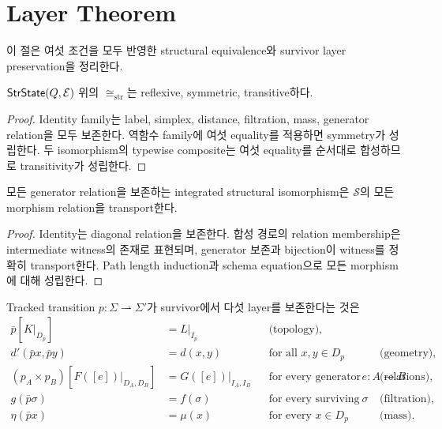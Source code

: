 \section{Layer Theorem}
이 절은 여섯 조건을 모두 반영한 structural equivalence와 survivor layer preservation을 정리한다.

\begin{proposition}
$\mathsf{StrState}(Q,\mathcal E)$ 위의 $\cong_{\mathrm{str}}$는 reflexive, symmetric, transitive하다.
\end{proposition}

\begin{proof}
Identity family는 label, simplex, distance, filtration, mass, generator relation을 모두 보존한다. 역함수 family에 여섯 equality를 적용하면 symmetry가 성립한다. 두 isomorphism의 typewise composite는 여섯 equality를 순서대로 합성하므로 transitivity가 성립한다.
\end{proof}

\begin{proposition}
모든 generator relation을 보존하는 integrated structural isomorphism은 $\mathcal S$의 모든 morphism relation을 transport한다.
\end{proposition}

\begin{proof}
Identity는 diagonal relation을 보존한다. 합성 경로의 relation membership은 intermediate witness의 존재로 표현되며, generator 보존과 bijection이 witness를 정확히 transport한다. Path length induction과 schema equation으로 모든 morphism에 대해 성립한다.
\end{proof}

\begin{definition}
Tracked transition $p:\Sigma\rightharpoonup\Sigma'$가 survivor에서 다섯 layer를 보존한다는 것은
\begin{align*}
\bar p[K|_{D_p}]&=L|_{I_p} &&\text{(topology)},\\
d'(\bar p x,\bar p y)&=d(x,y) &&\text{for all }x,y\in D_p &&\text{(geometry)},\\
(p_A\times p_B)[F([e])|_{D_A,D_B}]&=G([e])|_{I_A,I_B}
 &&\text{for every generator }e:A\to B &&\text{(relations)},\\
g(\bar p\sigma)&=f(\sigma) &&\text{for every surviving simplex }\sigma &&\text{(filtration)},\\
\eta(\bar p x)&=\mu(x) &&\text{for every }x\in D_p &&\text{(mass)}.
\end{align*}
\end{definition}

